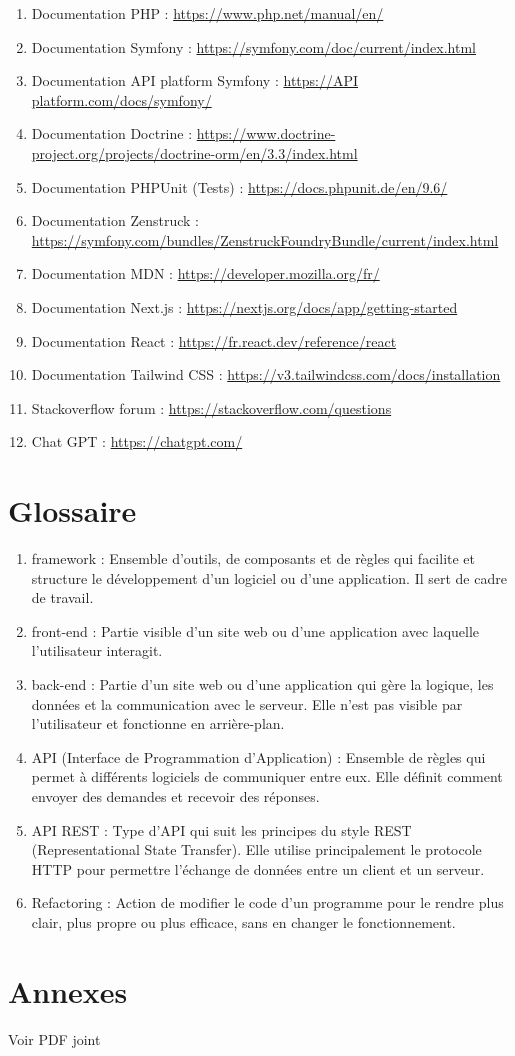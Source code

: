 \documentclass[a4paper,12pt]{report}
\begin{document}
\begin{enumerate}
    \item Documentation PHP : \url{https://www.php.net/manual/en/}
    \item Documentation Symfony : \url{https://symfony.com/doc/current/index.html}
    \item Documentation API platform Symfony : \url{https://API platform.com/docs/symfony/}
    \item Documentation Doctrine : \url{https://www.doctrine-project.org/projects/doctrine-orm/en/3.3/index.html}
    \item Documentation PHPUnit (Tests) : \url{https://docs.phpunit.de/en/9.6/}
    \item Documentation Zenstruck : \url{https://symfony.com/bundles/ZenstruckFoundryBundle/current/index.html}
    \item Documentation MDN : \url{https://developer.mozilla.org/fr/}
    \item Documentation Next.js : \url{https://nextjs.org/docs/app/getting-started}
    \item Documentation React : \url{https://fr.react.dev/reference/react}
    \item Documentation Tailwind CSS : \url{https://v3.tailwindcss.com/docs/installation}
    \item Stackoverflow forum : \url{https://stackoverflow.com/questions}
    \item Chat GPT : \url{https://chatgpt.com/}
\end{enumerate}

\chapter{Glossaire}
\begin{enumerate}
    \item framework : Ensemble d'outils, de composants et de règles qui facilite et structure le développement d'un logiciel ou d'une application. Il sert de cadre de travail.
    \item front-end : Partie visible d'un site web ou d'une application avec laquelle l'utilisateur interagit.
    \item back-end : Partie d'un site web ou d'une application qui gère la logique, les données et la communication avec le serveur. Elle n'est pas visible par l'utilisateur et fonctionne en arrière-plan.
    \item API (Interface de Programmation d’Application) : Ensemble de règles qui permet à différents logiciels de communiquer entre eux. Elle définit comment envoyer des demandes et recevoir des réponses. 
    \item API REST : Type d’API qui suit les principes du style REST (Representational State Transfer). Elle utilise principalement le protocole HTTP pour permettre l’échange de données entre un client et un serveur.
    \item Refactoring : Action de modifier le code d’un programme pour le rendre plus clair, plus propre ou plus efficace, sans en changer le fonctionnement.
\end{enumerate}

\chapter{Annexes}
Voir PDF joint
\end{document}

